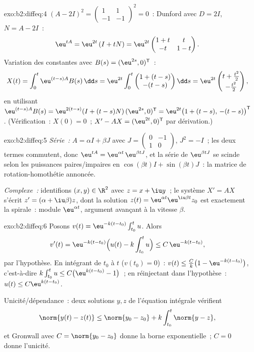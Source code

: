 \begin{solution}{exo:b2:diffeq:4}
$(A - 2I)^2 = \begin{pmatrix}1 & 1\\ -1 & -1\end{pmatrix}^2 = 0$~:
Dunford avec $D = 2I$, $N = A - 2I$~:
\[
\eu^{tA} = \eu^{2t}\,(I + tN)
= \eu^{2t}\begin{pmatrix} 1 + t & t\\ -t & 1 - t\end{pmatrix}.
\]
Variation des constantes avec $B(s) = (\eu^{2s}, 0)^{\mathsf T}$~:
\[
X(t) = \int_0^t \eu^{(t-s)A}B(s)\,\dd s
= \eu^{2t}\int_0^t \begin{pmatrix} 1 + (t-s)\\ -(t-s)
\end{pmatrix}\dd s
= \eu^{2t}\begin{pmatrix} t + \frac{t^2}{2}\\[2pt] -\frac{t^2}{2}
\end{pmatrix},
\]
en utilisant $\eu^{(t-s)A}B(s) = \eu^{2(t-s)}(I + (t-s)N)\,(\eu^{2s},
0)^{\mathsf T} = \eu^{2t}\bigl(1 + (t-s),\, -(t-s)\bigr)^{\mathsf
T}$. (Vérification~: $X(0) = 0$~; $X' - AX = (\eu^{2t}, 0)^{\mathsf
T}$ par dérivation.)
\end{solution}

\begin{solution}{exo:b2:diffeq:5}
\emph{Série~:} $A = \alpha I + \beta J$ avec $J =
\begin{pmatrix}0 & -1\\ 1 & 0\end{pmatrix}$, $J^2 = -I$~; les deux
termes commutent, donc $\eu^{tA} = \eu^{\alpha t}\,\eu^{\beta tJ}$,
et la série de $\eu^{\beta t J}$ se scinde selon les puissances
paires/impaires en $\cos(\beta t)I + \sin(\beta t)J$~: la matrice de
rotation-homothétie annoncée.

\emph{Complexe~:} identifions $(x, y) \in \R^2$ avec $z = x + \iu
y$~; le système $X' = AX$ s'écrit $z' = (\alpha + \iu\beta)z$, dont
la solution $z(t) = \eu^{\alpha t}\eu^{\iu\beta t}z_0$ est
exactement la spirale~: module $\eu^{\alpha t}$, argument avançant à
la vitesse $\beta$.
\end{solution}

\begin{solution}{exo:b2:diffeq:6}
Posons $v(t) = \eu^{-k(t - t_0)}\int_{t_0}^t u$. Alors
\[
v'(t) = \eu^{-k(t-t_0)}\Bigl(u(t) - k\int_{t_0}^t u\Bigr)
\leq C\,\eu^{-k(t-t_0)},
\]
par l'hypothèse. En intégrant de $t_0$ à $t$ ($v(t_0) = 0$)~:
$v(t) \leq \frac{C}{k}\bigl(1 - \eu^{-k(t - t_0)}\bigr)$,
c'est-à-dire $k\int_{t_0}^t u \leq C\bigl(\eu^{k(t-t_0)} - 1\bigr)$~;
en réinjectant dans l'hypothèse~: $u(t) \leq C\eu^{k(t-t_0)}$.

Unicité/dépendance~: deux solutions $y, z$ de l'équation intégrale
vérifient
\[
\norm{y(t) - z(t)} \leq \norm{y_0 - z_0} +
k\int_{t_0}^{t}\norm{y - z},
\]
et Gronwall avec $C = \norm{y_0 - z_0}$ donne la borne
exponentielle~; $C = 0$ donne l'unicité.
\end{solution}

